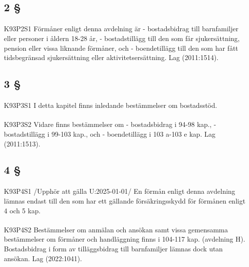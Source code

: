\documentclass[a4paper,notitlepage,openany,10pt]{book}
\begin{document}
\subsection*{2 §}
\paragraph*{}
{\tiny K93P2S1}
Förmåner enligt denna avdelning är
\newline - bostadsbidrag till barnfamiljer eller personer i åldern 18-28 år,
\newline - bostadstillägg till den som får sjukersättning, pension eller vissa liknande förmåner, och
\newline - boendetillägg till den som har fått tidsbegränsad sjukersättning eller aktivitetsersättning.
Lag (2011:1514).
\subsection*{3 §}
\paragraph*{}
{\tiny K93P3S1}
I detta kapitel finns inledande bestämmelser om bostadsstöd.
\paragraph*{}
{\tiny K93P3S2}
Vidare finns bestämmelser om
\newline - bostadsbidrag i 94-98 kap.,
\newline - bostadstillägg i 99-103 kap., och
\newline - boendetillägg i 103 a-103 e kap.
Lag (2011:1513).
\subsection*{4 §}
\paragraph*{}
{\tiny K93P4S1}
/Upphör att gälla U:2025-01-01/
En förmån enligt denna avdelning lämnas endast till den som har ett gällande försäkringsskydd för förmånen enligt 4 och 5 kap.
\paragraph*{}
{\tiny K93P4S2}
Bestämmelser om anmälan och ansökan samt vissa gemensamma bestämmelser om förmåner och handläggning finns i 104-117 kap. (avdelning H). Bostadsbidrag i form av tilläggsbidrag till barnfamiljer lämnas dock utan ansökan.
Lag (2022:1041).
\end{document}
